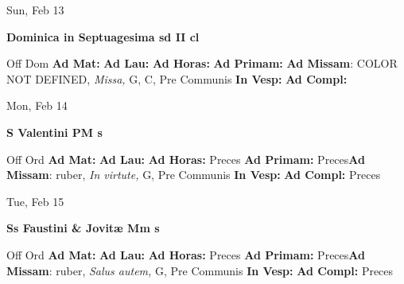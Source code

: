 \documentclass[10pt]{memoir}
\begin{document}
\begin{center}
\begin{minipage}{3.5in}
\vspace{2em}
\begin{center}Sun, Feb 13
\end{center}
\textbf{ \large Dominica in Septuagesima
\textnormal{\normalsize sd II cl}}

\begin{justify}Off Dom
\textbf{Ad Mat: }
\textbf{Ad Lau: }
\textbf{Ad Horas: }
\textbf{Ad Primam: }\textbf{Ad Missam}: COLOR NOT DEFINED, \textit{Missa,} G, C, Pre Communis
\textbf{In Vesp: }
\textbf{Ad Compl: }
\end{justify}
\end{minipage}
\end{center}

\begin{center}
\begin{minipage}{3.5in}
\vspace{2em}
\begin{center}Mon, Feb 14
\end{center}
\textbf{ \large S Valentini PM
\textnormal{\normalsize s}}

\begin{justify}Off Ord
\textbf{Ad Mat: }
\textbf{Ad Lau: }
\textbf{Ad Horas: }Preces
\textbf{Ad Primam: }Preces\textbf{Ad Missam}: ruber, \textit{In virtute,} G, Pre Communis
\textbf{In Vesp: }
\textbf{Ad Compl: }Preces
\end{justify}
\end{minipage}
\end{center}

\begin{center}
\begin{minipage}{3.5in}
\vspace{2em}
\begin{center}Tue, Feb 15
\end{center}
\textbf{ \large Ss Faustini \& Jovitæ Mm
\textnormal{\normalsize s}}

\begin{justify}Off Ord
\textbf{Ad Mat: }
\textbf{Ad Lau: }
\textbf{Ad Horas: }Preces
\textbf{Ad Primam: }Preces\textbf{Ad Missam}: ruber, \textit{Salus autem,} G, Pre Communis
\textbf{In Vesp: }
\textbf{Ad Compl: }Preces
\end{justify}
\end{minipage}
\end{center}
\end{document}
